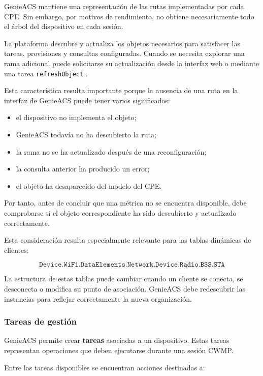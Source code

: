 GenieACS mantiene una representación de las rutas implementadas por cada
CPE. Sin embargo, por motivos de rendimiento, no obtiene necesariamente
todo el árbol del dispositivo en cada sesión.

La plataforma descubre y actualiza los objetos necesarios para satisfacer
las tareas, provisiones y consultas configuradas. Cuando se necesita
explorar una rama adicional puede solicitarse su actualización desde la
interfaz web o mediante una tarea \texttt{refreshObject}
\cite{genieacs_documentation,genieacs_api}.

Esta característica resulta importante porque la ausencia de una ruta en
la interfaz de GenieACS puede tener varios significados:

\begin{itemize}
    \item el dispositivo no implementa el objeto;
    \item GenieACS todavía no ha descubierto la ruta;
    \item la rama no se ha actualizado después de una reconfiguración;
    \item la consulta anterior ha producido un error;
    \item el objeto ha desaparecido del modelo del CPE.
\end{itemize}

Por tanto, antes de concluir que una métrica no se encuentra disponible,
debe comprobarse si el objeto correspondiente ha sido descubierto y
actualizado correctamente.

Esta consideración resulta especialmente relevante para las tablas
dinámicas de clientes:

\[
    \texttt{Device.WiFi.DataElements.Network.Device.Radio.BSS.STA}
\]

La estructura de estas tablas puede cambiar cuando un cliente se conecta,
se desconecta o modifica su punto de asociación. GenieACS debe redescubrir
las instancias para reflejar correctamente la nueva organización.


\subsubsection*{Tareas de gestión}

GenieACS permite crear \textbf{tareas} asociadas a un dispositivo. Estas
tareas representan operaciones que deben ejecutarse durante una sesión
CWMP.

Entre las tareas disponibles se encuentran acciones destinadas a:

